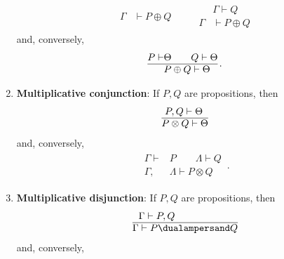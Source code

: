 \begin{enumerate}
\begin{gather}
\begin{aligned}
                    \hline
                    \Gamma&\vdash P\oplus Q
                \end{aligned}
                \qquad
                \begin{aligned}
                    &\Gamma\vdash Q\\
                    \hline
                    \Gamma&\vdash P\oplus Q
                \end{aligned}
            \end{gather}
            and, conversely,
            \begin{gather}
                \begin{aligned}
                    P\vdash&\Theta\qquad Q\vdash\Theta\\
                    \hline
                    &P\oplus Q\vdash\Theta
                \end{aligned}\,.
            \end{gather}
        \item\textbf{Multiplicative conjunction}: If $P,Q$ are propositions, then
            \begin{gather}
                \begin{aligned}
                    &\,\,P,Q\vdash\Theta\\
                    \hline
                    &P\otimes Q\vdash\Theta
                \end{aligned}
            \end{gather}
            and, conversely,
            \begin{gather}
                \begin{aligned}
                    \Gamma\vdash&P\qquad\Lambda\vdash Q\\
                    \hline
                    \Gamma,\,&\Lambda\vdash P\otimes Q
                \end{aligned}\,.
            \end{gather}
        \item\textbf{Multiplicative disjunction}: If $P,Q$ are propositions, then
            \begin{gather}
                \begin{aligned}
                    &\Gamma\vdash P,Q\\
                    \hline
                    \Gamma&\vdash P\dualampersand Q
                \end{aligned}
            \end{gather}
            and, conversely,

\end{enumerate}
